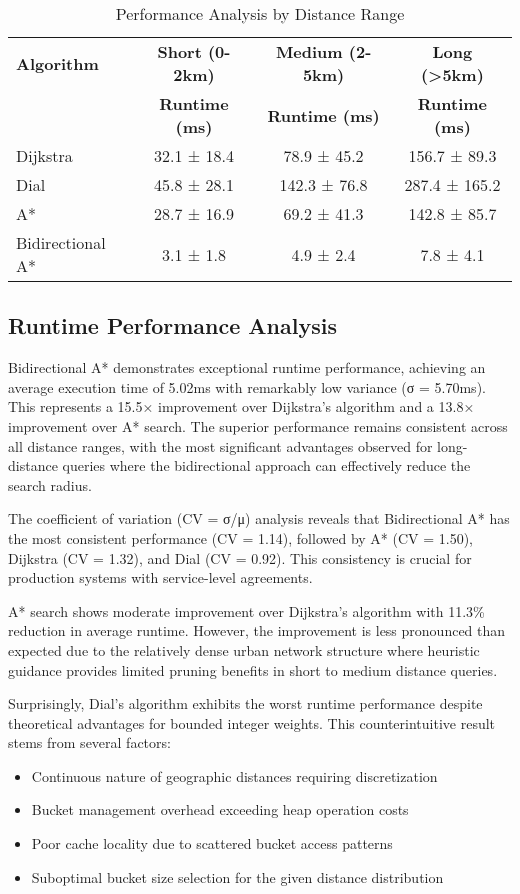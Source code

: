 \documentclass[conference]{IEEEtran}
\begin{document}
\begin{table}[htbp]
\caption{Performance Analysis by Distance Range}
\begin{center}
\begin{tabular}{|l|c|c|c|}
\hline
\textbf{Algorithm} & \textbf{Short (0-2km)} & \textbf{Medium (2-5km)} & \textbf{Long (>5km)} \\
& \textbf{Runtime (ms)} & \textbf{Runtime (ms)} & \textbf{Runtime (ms)} \\
\hline
Dijkstra & 32.1 ± 18.4 & 78.9 ± 45.2 & 156.7 ± 89.3 \\
\hline
Dial & 45.8 ± 28.1 & 142.3 ± 76.8 & 287.4 ± 165.2 \\
\hline
A* & 28.7 ± 16.9 & 69.2 ± 41.3 & 142.8 ± 85.7 \\
\hline
Bidirectional A* & 3.1 ± 1.8 & 4.9 ± 2.4 & 7.8 ± 4.1 \\
\hline
\end{tabular}
\end{center}
\label{tab:distance_analysis}
\end{table}

\subsection{Runtime Performance Analysis}

Bidirectional A* demonstrates exceptional runtime performance, achieving an average execution time of 5.02ms with remarkably low variance (σ = 5.70ms). This represents a 15.5× improvement over Dijkstra's algorithm and a 13.8× improvement over A* search. The superior performance remains consistent across all distance ranges, with the most significant advantages observed for long-distance queries where the bidirectional approach can effectively reduce the search radius.

The coefficient of variation (CV = σ/μ) analysis reveals that Bidirectional A* has the most consistent performance (CV = 1.14), followed by A* (CV = 1.50), Dijkstra (CV = 1.32), and Dial (CV = 0.92). This consistency is crucial for production systems with service-level agreements.

A* search shows moderate improvement over Dijkstra's algorithm with 11.3\% reduction in average runtime. However, the improvement is less pronounced than expected due to the relatively dense urban network structure where heuristic guidance provides limited pruning benefits in short to medium distance queries.

Surprisingly, Dial's algorithm exhibits the worst runtime performance despite theoretical advantages for bounded integer weights. This counterintuitive result stems from several factors:
\begin{itemize}
\item Continuous nature of geographic distances requiring discretization
\item Bucket management overhead exceeding heap operation costs
\item Poor cache locality due to scattered bucket access patterns
\item Suboptimal bucket size selection for the given distance distribution
\end{itemize}
\end{document}
